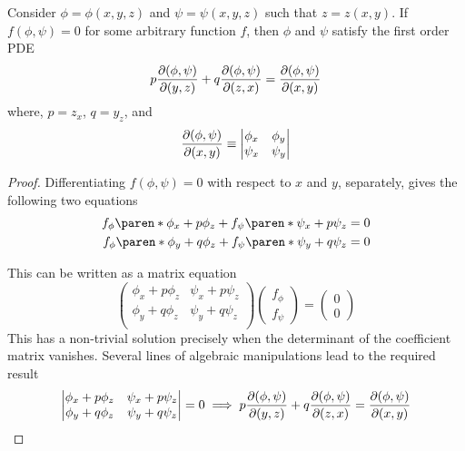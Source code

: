 \documentclass[11pt]{penrose}
\begin{document}
\begin{nthm}
    Consider $\phi = \phi(x,y,z)$ and $\psi = \psi(x,y,z)$ such that $z = z(x,y)$. If $f(\phi, \psi) = 0$ for some arbitrary function $f$, then $\phi$ and $\psi$ satisfy the first order PDE
    \begin{equation}
        p \frac{\partial(\phi, \psi)}{\partial(y,z)} + q \frac{\partial(\phi, \psi)}{\partial(z,x)} = \frac{\partial(\phi, \psi)}{\partial(x,y)}
    \end{equation}
    where, $p = z_x$, $q = y_z$, and
    \begin{equation*}
        \frac{\partial(\phi, \psi)}{\partial(x,y)} \equiv
        \begin{vmatrix}
            \phi_x & \phi_y\\
            \psi_x & \psi_y
        \end{vmatrix}
    \end{equation*}
\end{nthm}
\begin{proof}
    Differentiating $f(\phi, \psi) = 0$ with respect to $x$ and $y$, separately, gives the following two equations
    \begin{align}
        f_{\phi} \paren*{\phi_x + p \phi_z} + f_{\psi} \paren*{\psi_x + p \psi_z} &= 0\\
        f_{\phi} \paren*{\phi_y + q \phi_z} + f_{\psi} \paren*{\psi_y + q \psi_z} &= 0
    \end{align}

    This can be written as a matrix equation
    \begin{equation}
        \begin{pmatrix}
        \phi_x + p \phi_z & \psi_x + p \psi_z\\
        \phi_y + q \phi_z & \psi_y + q \psi_z\\
        \end{pmatrix}
        \begin{pmatrix}
        f_{\phi} \\ f_{\psi}
        \end{pmatrix}
        =
        \begin{pmatrix}
        0 \\ 0
        \end{pmatrix}
    \end{equation}
    This has a non-trivial solution precisely when the determinant of the coefficient matrix vanishes. Several lines of algebraic manipulations lead to the required result
    \begin{equation}
    \begin{vmatrix}
        \phi_x + p \phi_z & \psi_x + p \psi_z\\
        \phi_y + q \phi_z & \psi_y + q \psi_z\\
    \end{vmatrix} = 0
    \implies
    p \frac{\partial(\phi, \psi)}{\partial(y,z)}
    + q \frac{\partial(\phi, \psi)}{\partial(z,x)}
    = \frac{\partial(\phi, \psi)}{\partial(x,y)}
    \end{equation}
\end{proof}
\end{document}
